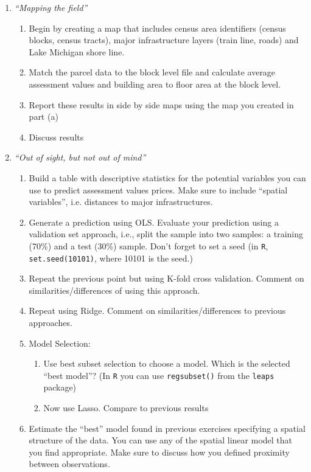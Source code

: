 \documentclass[12pt,onecolumn]{article}
\begin{document}
\begin{enumerate}
  \item {\it ``Mapping the field''}
  \begin{enumerate}
  \item Begin by creating a map that includes census area identifiers (census blocks, census tracts),  major infrastructure layers (train line, roads) and Lake Michigan shore line.
  \item Match the parcel data to the block level file and calculate average assessment values  and building area to floor area at the  block level.
  \item Report these results in side by side maps using the map you created in part (a)
  \item Discuss results
  \end{enumerate}
  \item {\it ``Out of sight, but not out of mind''}
  \begin{enumerate}
    
    \item Build a table with descriptive statistics for the potential variables you can use to predict assessment values prices. Make sure to include ``spatial variables'', i.e. distances to major infrastructures. 
  	\item Generate a prediction using OLS. Evaluate your prediction using a validation set approach, i.e., split the sample into two samples: a training (70\%) and a test (30\%) sample. Don't forget to set a seed (in \texttt{R}, \texttt{set.seed(10101)}, where 10101 is the seed.)  
    \item Repeat the previous point but using K-fold cross validation. Comment on similarities/differences of using this approach.
    \item Repeat using Ridge. Comment on similarities/differences to previous approaches.
    \item Model Selection:
    \begin{enumerate}
      \item Use best subset selection to choose a model. Which is the selected ``best model''? (In \texttt{R} you can use \texttt{regsubset()} from the \texttt{leaps} package)
      \item Now use Lasso. Compare to previous results
    \end{enumerate}  
    \item Estimate the ``best'' model found in previous exercises specifying a spatial structure of the data. You can use any of the spatial linear model that you find appropriate. Make sure to discuss how you defined proximity between observations.




\end{enumerate}
\end{enumerate}
\end{document}
